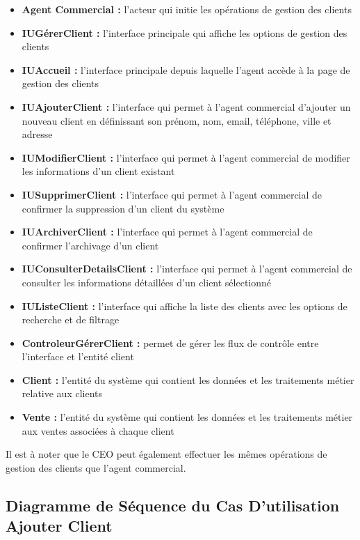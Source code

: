 \begin{itemize}[leftmargin=2em, topsep=4pt, itemsep=4pt]
  \item \textbf{Agent Commercial :} l'acteur qui initie les opérations de gestion des clients
  \item \textbf{IUGérerClient :} l'interface principale qui affiche les options de gestion des clients
  \item \textbf{IUAccueil :} l'interface principale depuis laquelle l'agent accède à la page de gestion des clients
  \item \textbf{IUAjouterClient :} l'interface qui permet à l'agent commercial d'ajouter un nouveau client en définissant son prénom, nom, email, téléphone, ville et adresse
  \item \textbf{IUModifierClient :} l'interface qui permet à l'agent commercial de modifier les informations d'un client existant
  \item \textbf{IUSupprimerClient :} l'interface qui permet à l'agent commercial de confirmer la suppression d'un client du système
  \item \textbf{IUArchiverClient :} l'interface qui permet à l'agent commercial de confirmer l'archivage d'un client
  \item \textbf{IUConsulterDetailsClient :} l'interface qui permet à l'agent commercial de consulter les informations détaillées d'un client sélectionné
  \newpage
  \item \textbf{IUListeClient :} l'interface qui affiche la liste des clients avec les options de recherche et de filtrage
  \item \textbf{ControleurGérerClient :} permet de gérer les flux de contrôle entre l'interface et l'entité client
  \item \textbf{Client :} l'entité du système qui contient les  données et les traitements métier relative aux clients
  \item \textbf{Vente :} l'entité du système qui contient les  données et les traitements métier aux ventes associées à chaque client
\end{itemize}

Il est à noter que le CEO peut également effectuer les mêmes opérations de gestion des clients que l'agent commercial.

\needspace{0.88\textheight}
\subsection{Diagramme de Séquence du Cas D'utilisation Ajouter Client}


